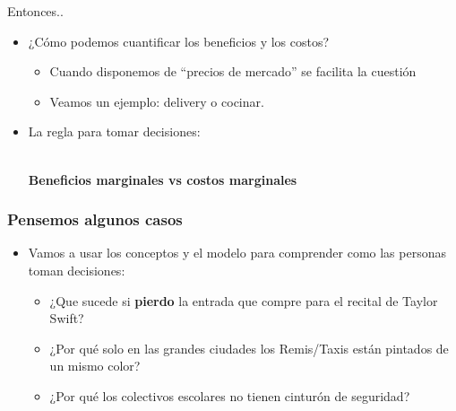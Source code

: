 \documentclass{beamer}
\begin{document}
\begin{frame}{Entonces.. }
    \begin{itemize}
        \item ¿Cómo podemos cuantificar los beneficios y los costos? 
        \begin{itemize}
        \item Cuando disponemos de ``precios de mercado'' se facilita la cuestión
        \item Veamos un ejemplo: delivery o cocinar.
        \end{itemize}
        \item La regla para tomar decisiones:
        \begin{boxB}
             \\ \vspace{2mm}
            \textbf{Beneficios marginales vs costos marginales} \centering 
        \end{boxB}
    \end{itemize} 
\end{frame}
\begin{frame}
\frametitle{Pensemos algunos casos}
\begin{itemize}
    \item Vamos a usar los conceptos y el modelo para comprender como las personas toman decisiones: \vspace{2mm}
    \begin{itemize} 
    \item ¿Que sucede si \textbf{pierdo} la entrada que compre para el recital de Taylor Swift? \vspace{2mm}
    \item ¿Por qué solo en las grandes ciudades los Remis/Taxis están pintados de un mismo color? \vspace{2mm}
    \item ¿Por qué los colectivos escolares no tienen cinturón de seguridad? 
    \end{itemize}
\end{itemize} 
\end{frame}
\end{document}
